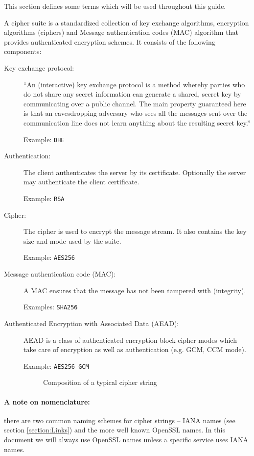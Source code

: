 
This section defines some terms which will be used throughout this guide.


A cipher suite is a standardized collection of key exchange algorithms, encryption 
algorithms (ciphers) and Message authentication codes (MAC) algorithm that provides
authenticated encryption schemes. It consists of the following components:

\begin{description}

\item[Key exchange protocol:]
``An (interactive) key exchange protocol is a method whereby parties who do not 
share any secret information can generate a shared, secret key by communicating 
over a public channel. The main property guaranteed here is that an 
eavesdropping adversary who sees all the messages sent over the communication 
line does not learn anything about the resulting secret key.'' \cite{katz2008introduction}

Example: \texttt{DHE}

\item[Authentication:]
The client authenticates the server by its certificate. Optionally the server 
may authenticate the client certificate.

Example: \texttt{RSA}

\item[Cipher:]
The cipher is used to encrypt the message stream. It also contains the key size
and mode used by the suite.

Example: \texttt{AES256}

\item[Message authentication code (MAC):]
A MAC ensures that the message has not been tampered with (integrity).

Examples: \texttt{SHA256}

\item[Authenticated Encryption with Associated Data (AEAD):]
AEAD is a class of authenticated encryption block-cipher modes
which take care of encryption as well as authentication (e.g. GCM, CCM mode). 

Example: \texttt{AES256-GCM}



\begin{figure}[h]
\caption{Composition of a typical cipher string}
\end{figure}
\end{description}
%
\paragraph*{A note on nomenclature:} there are two common naming schemes for cipher strings -- IANA names (see section \ref{section:Links}) and the more well known OpenSSL names. In this document we will always use OpenSSL names unless a specific service uses IANA names.
